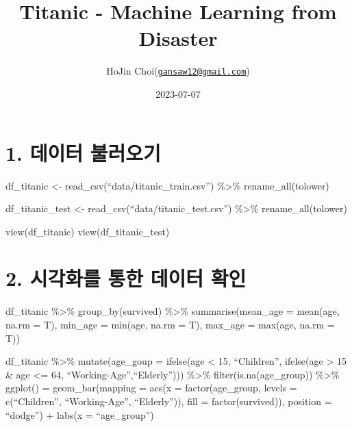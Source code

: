 \documentclass[
]{article}
\title{Titanic - Machine Learning from Disaster}
\author{HoJin
Choi(\href{mailto:gansaw12@gmail.com}{\nolinkurl{gansaw12@gmail.com}})}
\date{2023-07-07}
\begin{document}
\maketitle

{
\setcounter{tocdepth}{3}
\tableofcontents
}
\hypertarget{uxb370uxc774uxd130-uxbd88uxb7ecuxc624uxae30}{%
\section{1. 데이터
불러오기}\label{uxb370uxc774uxd130-uxbd88uxb7ecuxc624uxae30}}

df\_titanic \textless- read\_csv(``data/titanic\_train.csv'')
\%\textgreater\% rename\_all(tolower)

df\_titanic\_test \textless- read\_csv(``data/titanic\_test.csv'')
\%\textgreater\% rename\_all(tolower)

view(df\_titanic) view(df\_titanic\_test)

\hypertarget{uxc2dcuxac01uxd654uxb97c-uxd1b5uxd55c-uxb370uxc774uxd130-uxd655uxc778}{%
\section{2. 시각화를 통한 데이터
확인}\label{uxc2dcuxac01uxd654uxb97c-uxd1b5uxd55c-uxb370uxc774uxd130-uxd655uxc778}}

df\_titanic \%\textgreater\% group\_by(survived) \%\textgreater\%
summarise(mean\_age = mean(age, na.rm = T), min\_age = min(age, na.rm =
T), max\_age = max(age, na.rm = T))

df\_titanic \%\textgreater\% mutate(age\_goup = ifelse(age \textless{}
15, ``Children'', ifelse(age \textgreater{} 15 \& age \textless= 64,
``Working-Age'',``Elderly''))) \%\textgreater\%
filter(is.na(age\_group)) \%\textgreater\% ggplot() = geom\_bar(mapping
= aes(x = factor(age\_group, levels = c(``Children'', ``Working-Age'',
``Elderly'')), fill = factor(survived)), position = ``dodge'') + labs(x
= ``age\_group'')
\end{document}
